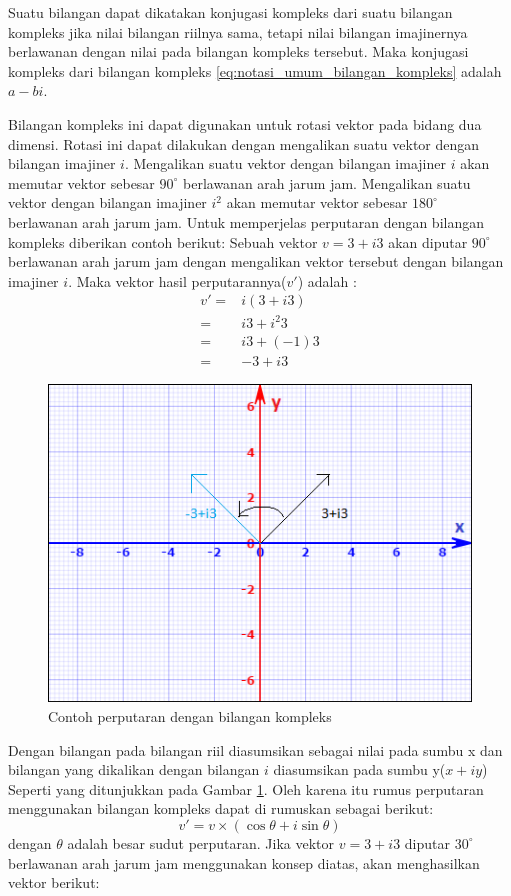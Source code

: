 Suatu bilangan dapat dikatakan konjugasi kompleks dari suatu bilangan kompleks jika nilai bilangan riilnya sama, tetapi nilai bilangan imajinernya berlawanan dengan nilai pada bilangan kompleks tersebut. Maka konjugasi kompleks dari bilangan kompleks \ref{eq:notasi_umum_bilangan_kompleks} adalah \(a-bi\). 

Bilangan kompleks ini dapat digunakan untuk rotasi vektor pada bidang dua dimensi. Rotasi ini dapat dilakukan dengan mengalikan suatu vektor dengan bilangan imajiner $i$. Mengalikan suatu vektor dengan bilangan imajiner $i$ akan memutar vektor sebesar $90^{\circ}$ berlawanan arah jarum jam. Mengalikan suatu vektor dengan bilangan imajiner $i^2$ akan memutar vektor sebesar $180^{\circ}$ berlawanan arah jarum jam. Untuk memperjelas perputaran dengan bilangan kompleks diberikan contoh berikut:
Sebuah vektor $v = 3 + i3$ akan diputar $90^{\circ}$ berlawanan arah jarum jam dengan mengalikan vektor tersebut dengan bilangan imajiner $i$. Maka vektor hasil perputarannya($v'$) adalah :
\begin{equation}
	\begin{split}
		v' = &i(3 + i3)\\
		= & i3 + i^2 3\\
		= & i3 + (-1) 3\\
		= & -3 + i3
	\end{split}
\label{eq:rotasi_kompleks}
\end{equation}
\begin{figure}[htbp]
\centering
\includegraphics[scale=1]{Gambar/diagram-rotasi-kompleks.PNG}
\caption{Contoh perputaran dengan bilangan kompleks} 
\label{fig:diagram-rotasi-kompleks}
\end{figure}
Dengan bilangan pada bilangan riil diasumsikan sebagai nilai pada sumbu x dan bilangan yang dikalikan dengan bilangan $i$ diasumsikan pada sumbu y($x + iy$) Seperti yang ditunjukkan pada Gambar \ref{fig:diagram-rotasi-kompleks}. Oleh karena itu rumus perputaran menggunakan bilangan kompleks dapat di rumuskan sebagai berikut: 
\[
	v' = v\times(\cos \theta + i \sin \theta)
\]
dengan $\theta$ adalah besar sudut perputaran. Jika vektor $v = 3 + i3$ diputar $30^{\circ}$ berlawanan arah jarum jam menggunakan konsep diatas, akan menghasilkan vektor berikut:

